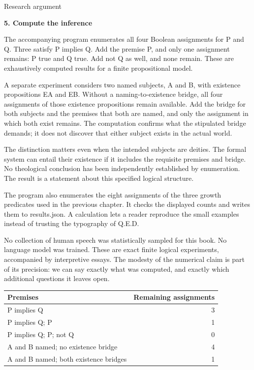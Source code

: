\documentclass[10pt]{article}
\begin{document}
\clearpage
{\small\color{accent}Research argument}\par
{\LARGE\bfseries\color{ink}5. Compute the inference}\par\vspace{7pt}
The accompanying program enumerates all four Boolean assignments for P and Q. Three satisfy P implies Q. Add the premise P, and only one assignment remains: P true and Q true. Add not Q as well, and none remain. These are exhaustively computed results for a finite propositional model.\par
A separate experiment considers two named subjects, A and B, with existence propositions EA and EB. Without a naming-to-existence bridge, all four assignments of those existence propositions remain available. Add the bridge for both subjects and the premises that both are named, and only the assignment in which both exist remains. The computation confirms what the stipulated bridge demands; it does not discover that either subject exists in the actual world.\par
The distinction matters even when the intended subjects are deities. The formal system can entail their existence if it includes the requisite premises and bridge. No theological conclusion has been independently established by enumeration. The result is a statement about this specified logical structure.\par
The program also enumerates the eight assignments of the three growth predicates used in the previous chapter. It checks the displayed counts and writes them to results.json. A calculation lets a reader reproduce the small examples instead of trusting the typography of Q.E.D.\par
No collection of human speech was statistically sampled for this book. No language model was trained. These are exact finite logical experiments, accompanied by interpretive essays. The modesty of the numerical claim is part of its precision: we can say exactly what was computed, and exactly which additional questions it leaves open.\par
{\small\begin{tabularx}{\linewidth}{Xr}\toprule
Premises & Remaining assignments\\\midrule
P implies Q & 3\\
P implies Q; P & 1\\
P implies Q; P; not Q & 0\\
A and B named; no existence bridge & 4\\
A and B named; both existence bridges & 1\\
\bottomrule\end{tabularx}}\par
\end{document}
